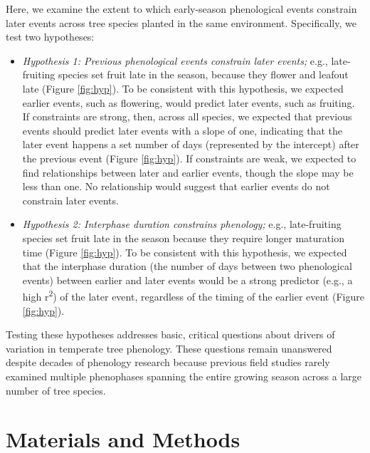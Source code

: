 \documentclass{article}
\begin{document}
\par Here, we examine the extent to which early-season phenological events constrain later events across tree species planted in the same environment. Specifically, we test two hypotheses:
\begin{itemize}
\item \textit{Hypothesis 1: Previous phenological events constrain later events;} e.g., late-fruiting species set fruit late in the season, because they flower and leafout late (Figure \ref{fig:hyp}). To be consistent with this hypothesis, we expected earlier events, such as flowering, would predict later events, such as fruiting. If constraints are strong, then, across all species, we expected that previous events should predict later events with a slope of one, indicating that the later event happens a set number of days (represented by the intercept) after the previous event (Figure \ref{fig:hyp}). If constraints are weak, we expected to find relationships between later and earlier events, though the slope may be less than one. No relationship would suggest that earlier events do not constrain later events.

\item \textit{Hypothesis 2: Interphase duration constrains phenology;} e.g., late-fruiting species set fruit late in the season because they require longer maturation time (Figure \ref{fig:hyp}). To be consistent with this hypothesis, we expected that the interphase duration (the number of days between two phenological events) between earlier and later events would be a strong predictor (e.g., a high r\textsuperscript{2}) of the later event, regardless of the timing of the earlier event (Figure \ref{fig:hyp}). 
\end{itemize}
Testing these hypotheses addresses basic, critical questions about drivers of variation in temperate tree phenology. These questions remain unanswered despite decades of phenology research because previous field studies rarely examined multiple phenophases spanning the entire growing season across a large number of tree species. 
\section* {Materials and Methods}
\end{document}
